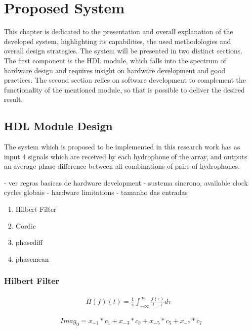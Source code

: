 \chapter{Proposed System} \label{chap:proposed_sys}

This chapter is dedicated to the presentation and overall explanation of the developed system, highlighting its capabilities, the used methodologies and overall design strategies. 
The system will be presented in two distinct sections. The first component is the HDL module, which falls into the spectrum of hardware design and requires insight on hardware development and good practices. The second section relies on software development to complement the functionality of the mentioned module, so that is possible to deliver the desired result.

\section{HDL Module Design}

The system which is proposed to be implemented in this research work has as input 4 signals which are received by each hydrophone of the array, and outputs an average phase difference between all combinations of pairs of hydrophones. 

- ver regras basicas de hardware development
- sustema sincrono, available clock cycles globais
- hardware limitations
- tamanho das entradas


\begin{enumerate}
	\item Hilbert Filter
	\item Cordic
	\item phasediff
	\item phasemean
\end{enumerate}

\subsection{Hilbert Filter}


\begin{eqnarray}
H(f)(t) = \frac{1}{\pi}\int_{-\infty}^{\infty}\frac{f(\tau)}{t-\tau}d\tau
\label{eq:hilbert_integral}
\end{eqnarray}

\begin{eqnarray}
&Imag_0 = x_{-1}*c_1 + x_{-3}*c_3 + x_{-5}*c_5 + x_{-7}*c_7
\label{eq:hilbert_imeq}
\end{eqnarray}

